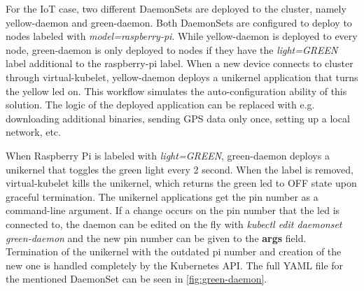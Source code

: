 For the IoT case, two different DaemonSets are deployed to the cluster, namely yellow-daemon and green-daemon. Both DaemonSets are configured to deploy to nodes labeled with \textit{model=raspberry-pi}. While yellow-daemon is deployed to every node, green-daemon is only deployed to nodes if they have the \textit{light=GREEN} label additional to the raspberry-pi label. When a new device connects to cluster through virtual-kubelet, yellow-daemon deploys a unikernel application that turns the yellow led on. This workflow simulates the auto-configuration ability of this solution. The logic of the deployed application can be replaced with e.g. downloading additional binaries, sending GPS data only once, setting up a local network, etc.


When Raspberry Pi is labeled with \textit{light=GREEN}, green-daemon deploys a unikernel that toggles the green light every 2 second. When the label is removed, virtual-kubelet kills the unikernel, which returns the green led to OFF state upon graceful termination. The unikernel applications get the pin number as a command-line argument. If a change occurs on the pin number that the led is connected to, the daemon can be edited on the fly with \textit{kubectl edit daemonset green-daemon} and the new pin number can be given to the \textbf{args} field. Termination of the unikernel with the outdated pi number and creation of the new one is handled completely by the Kubernetes API. The full YAML file for the mentioned DaemonSet can be seen in \ref{fig:green-daemon}.



